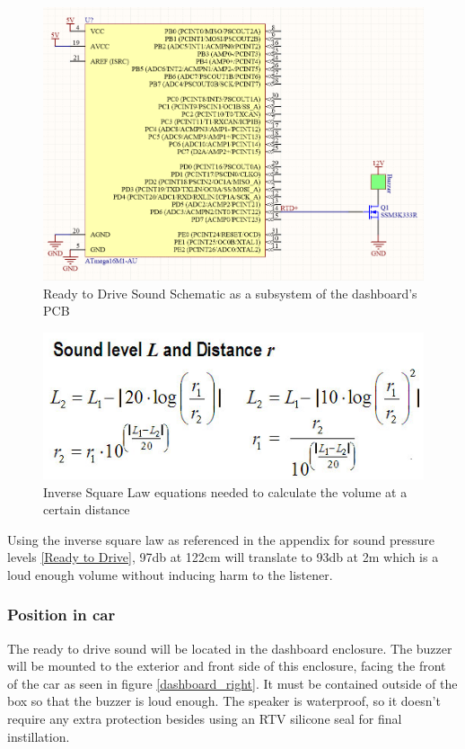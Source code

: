 \documentclass{article}
\begin{document}
\begin{figure}[H]
	\includegraphics[width=\linewidth]{RTDS_Schematic_Simplified}
	\caption{Ready to Drive Sound Schematic as a subsystem of the dashboard's PCB}
\end{figure}
\begin{figure}[H]
\centering
	\includegraphics[width=0.6\linewidth]{FormulasForDistanceAndSoundLevel}
	\caption{Inverse Square Law equations needed to calculate the volume at a certain distance}
\end{figure}
Using the inverse square law as referenced in the appendix  for sound pressure levels \ref{Ready to Drive}, 97db at 122cm will translate to 93db at 2m which is a loud enough volume without inducing harm to the listener. 
\subsubsection{Position in car}
The ready to drive sound will be located in the dashboard enclosure. The buzzer will be mounted
to the exterior and front side of this enclosure, facing the front of the car as seen in figure \ref{dashboard_right}. It must be contained outside of the box so that the buzzer is
loud enough. The speaker is waterproof, so it doesn't require any extra protection besides using an RTV silicone seal for final instillation. 
\end{document}
